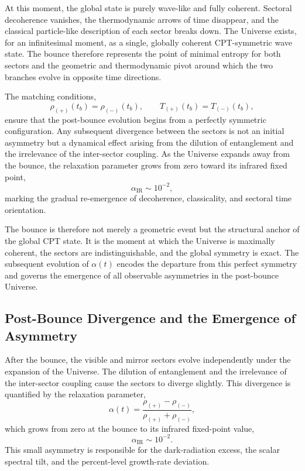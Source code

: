 \documentclass[11pt,a4paper]{article}
\begin{document}
At this moment, the global state is purely wave-like and fully coherent. Sectoral decoherence
vanishes, the thermodynamic arrows of time disappear, and the classical particle-like description
of each sector breaks down. The Universe exists, for an infinitesimal moment, as a single,
globally coherent CPT-symmetric wave state. The bounce therefore represents the point of
minimal entropy for both sectors and the geometric and thermodynamic pivot around which the
two branches evolve in opposite time directions.

The matching conditions,
\begin{equation}
    \rho_{(+)}(t_b) = \rho_{(-)}(t_b), \qquad
    T_{(+)}(t_b) = T_{(-)}(t_b),
\end{equation}
ensure that the post-bounce evolution begins from a perfectly symmetric configuration. Any
subsequent divergence between the sectors is not an initial asymmetry but a dynamical effect
arising from the dilution of entanglement and the irrelevance of the inter-sector coupling. As the
Universe expands away from the bounce, the relaxation parameter grows from zero toward its
infrared fixed point,
\begin{equation}
    \alpha_{\mathrm{IR}} \sim 10^{-2},
\end{equation}
marking the gradual re-emergence of decoherence, classicality, and sectoral time orientation.

The bounce is therefore not merely a geometric event but the structural anchor of the global
CPT state. It is the moment at which the Universe is maximally coherent, the sectors are
indistinguishable, and the global symmetry is exact. The subsequent evolution of $\alpha(t)$
encodes the departure from this perfect symmetry and governs the emergence of all observable
asymmetries in the post-bounce Universe.


\subsection{Post-Bounce Divergence and the Emergence of Asymmetry}

After the bounce, the visible and mirror sectors evolve independently under the expansion of the Universe. The dilution of entanglement and the irrelevance of the inter-sector coupling cause the sectors to diverge slightly. This divergence is quantified by the relaxation parameter,
\begin{equation}
    \alpha(t) = \frac{\rho_{(+)} - \rho_{(-)}}{\rho_{(+)} + \rho_{(-)}},
\end{equation}
which grows from zero at the bounce to its infrared fixed-point value,
\begin{equation}
    \alpha_{\mathrm{IR}} \sim 10^{-2}.
\end{equation}
This small asymmetry is responsible for the dark-radiation excess, the scalar spectral tilt, and the percent-level growth-rate deviation.
\end{document}
